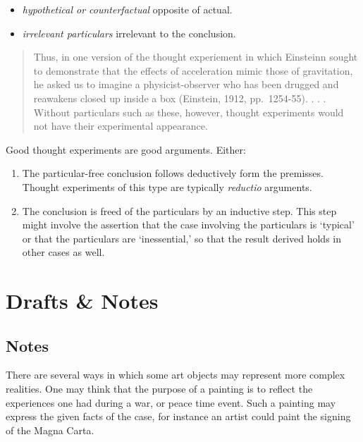 \documentclass[
  letterpaper,
  DIV=11,
  numbers=noendperiod]{scrreprt}
\providecommand{\tightlist}{%
  \setlength{\itemsep}{0pt}\setlength{\parskip}{0pt}}\usepackage{longtable,booktabs,array}
\begin{document}
\begin{tcolorbox}[enhanced jigsaw, arc=.35mm, breakable, rightrule=.15mm, colback=white, colframe=quarto-callout-important-color-frame, bottomrule=.15mm, leftrule=.75mm, opacityback=0, toprule=.15mm, left=2mm]
\begin{tcolorbox}[enhanced jigsaw, arc=.35mm, breakable, rightrule=.15mm, colback=white, colframe=quarto-callout-tip-color-frame, bottomrule=.15mm, leftrule=.75mm, opacityback=0, toprule=.15mm, left=2mm]
\begin{itemize}
\tightlist
\item
  \emph{hypothetical or counterfactual} opposite of actual.
\item
  \emph{irrelevant particulars} irrelevant to the conclusion.
\end{itemize}

\begin{quote}
Thus, in one version of the thought experiement in which Einsteinn
sought to demonstrate that the effects of acceleration mimic those of
gravitation, he asked us to imagine a physicist-observer who has been
drugged and reawakens closed up inside a box (Einstein, 1912,
pp.~1254-55). . . . Without particulars such as these, however, thought
experiments would not have their experimental appearance.
\end{quote}

Good thought experiments are good arguments. Either:

\begin{enumerate}
\def\labelenumi{\arabic{enumi}.}
\tightlist
\item
  The particular-free conclusion follows deductively form the premisses.
  Thought experiments of this type are typically \emph{reductio}
  arguments.
\item
  The conclusion is freed of the particulars by an inductive step. This
  step might involve the assertion that the case involving the
  particulars is `typical' or that the particulars are `inessential,' so
  that the result derived holds in other cases as well.
\end{enumerate}

\part{Drafts \& Notes}

\chapter{Notes}\label{notes}

There are several ways in which some art objects may represent more
complex realities. One may think that the purpose of a painting is to
reflect the experiences one had during a war, or peace time event. Such
a painting may express the given facts of the case, for instance an
artist could paint the signing of the Magna Carta.


\end{tcolorbox}
\end{tcolorbox}
\end{document}
